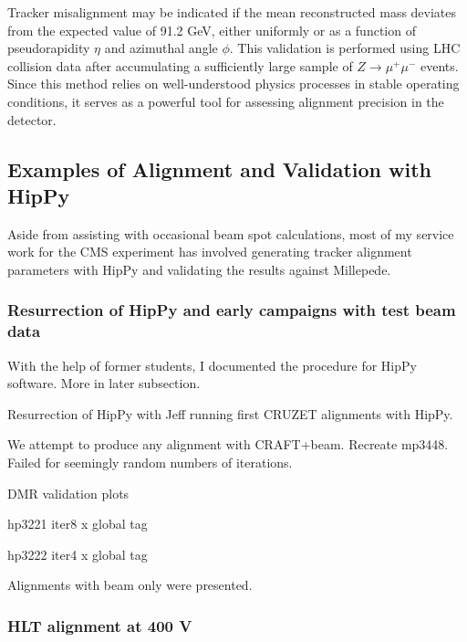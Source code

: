Tracker misalignment may be indicated if the mean reconstructed mass deviates from the expected value of 91.2 GeV, either uniformly or as a function of pseudorapidity \( \eta \) and azimuthal angle \( \phi \). This validation is performed using LHC collision data after accumulating a sufficiently large sample of \( Z \to \mu^+\mu^- \) events. Since this method relies on well-understood physics processes in stable operating conditions, it serves as a powerful tool for assessing alignment precision in the detector.

\subsection{Examples of Alignment and Validation with HipPy}

Aside from assisting with occasional beam spot calculations, most of my service work for the CMS experiment has involved generating tracker alignment parameters with HipPy and validating the results against Millepede. 

\subsubsection{Resurrection of HipPy and early campaigns with test beam data}

With the help of former students, I documented the procedure for HipPy software. More in later subsection. 

Resurrection of HipPy with Jeff running first CRUZET alignments with HipPy. 

We attempt to produce any alignment with CRAFT+beam. Recreate mp3448. Failed for seemingly random numbers of iterations.

DMR validation plots

hp3221 iter8 x global tag

hp3222 iter4 x global tag

Alignments with beam only were presented.


\subsubsection{HLT alignment at 400 V}

